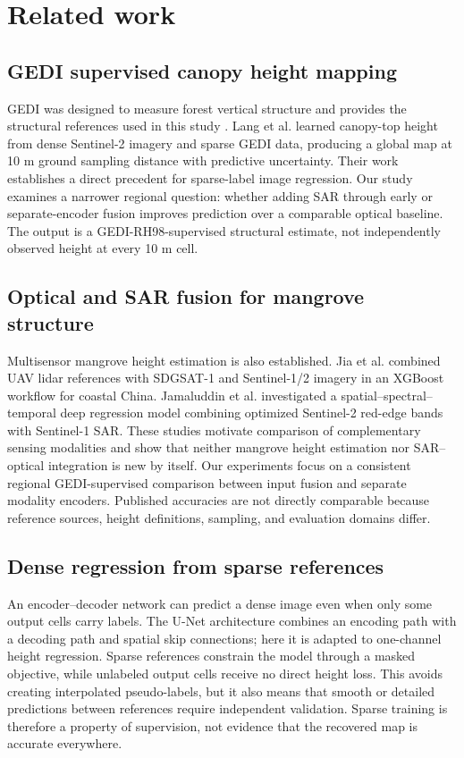 \section{Related work}

\subsection{GEDI supervised canopy height mapping}

GEDI was designed to measure forest vertical structure and provides the structural references used in this study \citep{dubayah2020}. Lang et al. \citep{lang2023} learned canopy-top height from dense Sentinel-2 imagery and sparse GEDI data, producing a global map at 10 m ground sampling distance with predictive uncertainty. Their work establishes a direct precedent for sparse-label image regression. Our study examines a narrower regional question: whether adding SAR through early or separate-encoder fusion improves prediction over a comparable optical baseline. The output is a GEDI-RH98-supervised structural estimate, not independently observed height at every 10 m cell.

\subsection{Optical and SAR fusion for mangrove structure}

Multisensor mangrove height estimation is also established. Jia et al. \citep{jia2025} combined UAV lidar references with SDGSAT-1 and Sentinel-1/2 imagery in an XGBoost workflow for coastal China. Jamaluddin et al. \citep{jamaluddin2025} investigated a spatial--spectral--temporal deep regression model combining optimized Sentinel-2 red-edge bands with Sentinel-1 SAR. These studies motivate comparison of complementary sensing modalities and show that neither mangrove height estimation nor SAR--optical integration is new by itself. Our experiments focus on a consistent regional GEDI-supervised comparison between input fusion and separate modality encoders. Published accuracies are not directly comparable because reference sources, height definitions, sampling, and evaluation domains differ.

\subsection{Dense regression from sparse references}

An encoder--decoder network can predict a dense image even when only some output cells carry labels. The U-Net architecture \citep{ronneberger2015} combines an encoding path with a decoding path and spatial skip connections; here it is adapted to one-channel height regression. Sparse references constrain the model through a masked objective, while unlabeled output cells receive no direct height loss. This avoids creating interpolated pseudo-labels, but it also means that smooth or detailed predictions between references require independent validation. Sparse training is therefore a property of supervision, not evidence that the recovered map is accurate everywhere.

